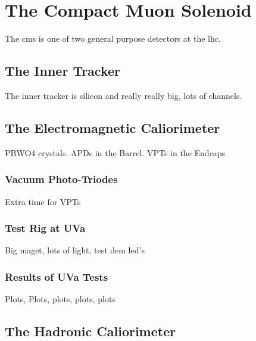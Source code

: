 \chapter{The Compact Muon Solenoid}
\label{cms_description_overview}

The \acrfull{cms} is one of two general purpose detectors at the \acrshort{lhc}.  

\section{The Inner Tracker}
\label{inner_tracker_description}

\par The inner tracker is silicon and really really big, lots of
channels.

\section{The Electromagnetic Caliorimeter}
\label{ecal_description}

\par PBWO4 crystals.  APDs in the Barrel.  VPTs in the Endcaps

\subsection{Vacuum Photo-Triodes}
\label{vpt_description}

\par Extra time for VPTs

\subsection{Test Rig at UVa}
\label{vpt_test_rig_description}

\par Big maget, lots of light, test dem led's

\subsection{Results of UVa Tests}
\label{vpt_results_description}

\par Plots, Plots, plots, plots, plots

\section{The Hadronic Caliorimeter}
\label{hcal_description}

